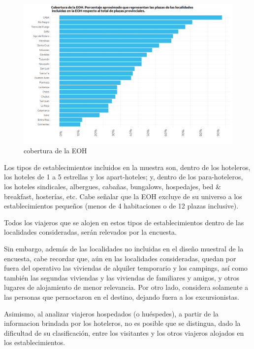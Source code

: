 \documentclass[
  openany]{book}
\begin{document}
\begin{figure}

{\centering \includegraphics[width=1\linewidth]{imagenes/figura2.2} 

}

\caption{cobertura de la EOH}\label{fig:cobertura}
\end{figure}

Los tipos de establecimientos incluidos en la muestra son, dentro de los hoteleros, los hoteles de 1 a 5 estrellas y los apart-hoteles; y, dentro de los para-hoteleros, los hoteles sindicales, albergues, cabañas, bungalows, hospedajes, bed \& breakfast, hosterías, etc.
Cabe señalar que la EOH excluye de su universo a los establecimientos pequeños (menos de 4 habitaciones o de 12 plazas inclusive).

Todos los viajeros que se alojen en estos tipos de establecimientos dentro de las localidades consideradas, serán relevados por la encuesta.

Sin embargo, además de las localidades no incluidas en el diseño muestral de la encuesta, cabe recordar que, aún en las localidades consideradas, quedan por fuera del operativo las viviendas de alquiler temporario y los campings, así como también las segundas viviendas y las viviendas de familiares y amigos, y otros lugares de alojamiento de menor relevancia.
Por otro lado, considera solamente a las personas que pernoctaron en el destino, dejando fuera a los excursionistas.

Asimismo, al analizar viajeros hospedados (o huéspedes), a partir de la informacion brindada por los hoteleros, no es posible que se distingua, dado la dificultad de su clasificación, entre los visitantes y los otros viajeros alojados en los establecimientos.
\end{document}
